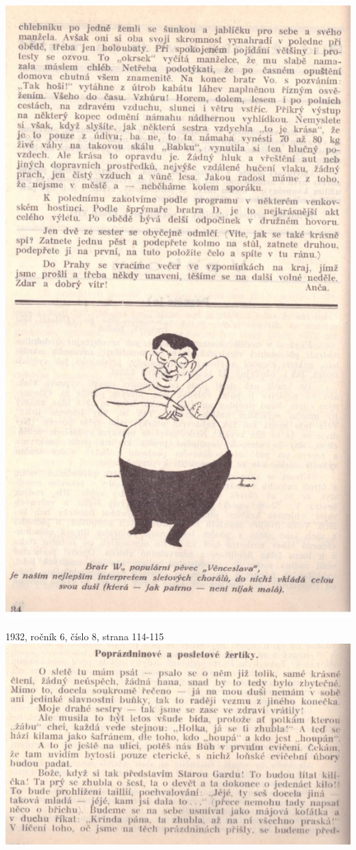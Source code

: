 \documentclass[11pt]{article}
\begin{document}
\includegraphics[width=\imagewidth]{original/1932/Skener_20250320 (10).jpg}

1932, ročník 6, číslo 8, strana 114-115 \\
\includegraphics[width=\imagewidth]{original/1932/Skener_20250320 (11).jpg}
\end{document}
